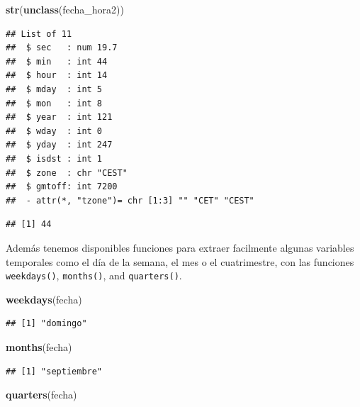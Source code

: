 \documentclass[11pt,]{book}
\newenvironment{Shaded}{\begin{snugshade}}{\end{snugshade}}
\newcommand{\CommentTok}[1]{\textcolor[rgb]{0.37,0.37,0.37}{\textit{#1}}}
\newcommand{\KeywordTok}[1]{\textcolor[rgb]{0.27,0.27,0.27}{\textbf{#1}}}
\newcommand{\NormalTok}[1]{#1}
\newcommand{\OperatorTok}[1]{\textcolor[rgb]{0.43,0.43,0.43}{\textbf{#1}}}
\begin{document}
\begin{Shaded}
\begin{Highlighting}[]
\KeywordTok{str}\NormalTok{(}\KeywordTok{unclass}\NormalTok{(fecha_hora2))}
\end{Highlighting}
\end{Shaded}

\begin{verbatim}
## List of 11
##  $ sec   : num 19.7
##  $ min   : int 44
##  $ hour  : int 14
##  $ mday  : int 5
##  $ mon   : int 8
##  $ year  : int 121
##  $ wday  : int 0
##  $ yday  : int 247
##  $ isdst : int 1
##  $ zone  : chr "CEST"
##  $ gmtoff: int 7200
##  - attr(*, "tzone")= chr [1:3] "" "CET" "CEST"
\end{verbatim}

\begin{Shaded}
\end{Shaded}

\begin{verbatim}
## [1] 44
\end{verbatim}

Además tenemos disponibles funciones para extraer facilmente algunas variables temporales como el día de la semana, el mes o el cuatrimestre, con las funciones \texttt{weekdays()}, \texttt{months()}, and \texttt{quarters()}.

\begin{Shaded}
\begin{Highlighting}[]
\KeywordTok{weekdays}\NormalTok{(fecha)}
\end{Highlighting}
\end{Shaded}

\begin{verbatim}
## [1] "domingo"
\end{verbatim}

\begin{Shaded}
\begin{Highlighting}[]
\KeywordTok{months}\NormalTok{(fecha)}
\end{Highlighting}
\end{Shaded}

\begin{verbatim}
## [1] "septiembre"
\end{verbatim}

\begin{Shaded}
\begin{Highlighting}[]
\KeywordTok{quarters}\NormalTok{(fecha)}
\end{Highlighting}
\end{Shaded}
\end{document}
